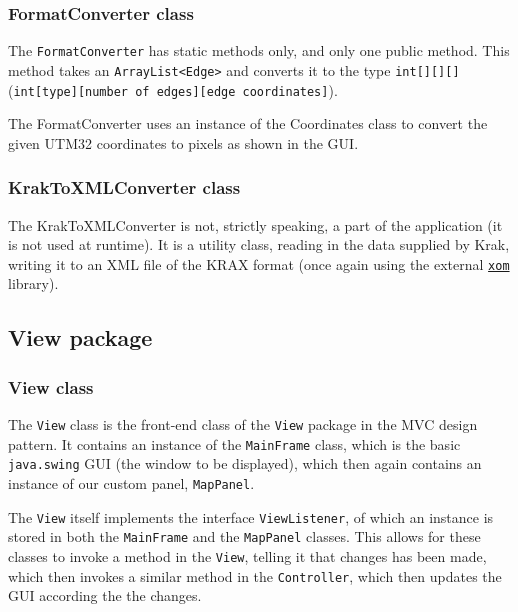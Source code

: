 \documentclass[a4paper,11pt]{article}
\begin{document}
\subsubsection{FormatConverter class} %
The \texttt{FormatConverter} has static methods only, and only one public method. This method takes an \texttt{ArrayList<Edge>} and converts it to the type \texttt{int[][][]} (\texttt{int[type][number of edges][edge coordinates]}).

The FormatConverter uses an instance of the Coordinates class to convert the given UTM32 coordinates to pixels as shown in the GUI.

\subsubsection{KrakToXMLConverter class} %
The KrakToXMLConverter is not, strictly speaking, a part of the application (it is not used at runtime). It is a utility class, reading in the data supplied by Krak, writing it to an XML file of the KRAX format (once again using the external \href{www.xom.nu}{\texttt{xom}} library).

\subsection{View package} %

\subsubsection{View class} %
The \texttt{View} class is the front-end class of the \texttt{View} package in the MVC design pattern. It contains an instance of the \texttt{MainFrame} class, which is the basic \texttt{java.swing} GUI (the window to be displayed), which then again contains an instance of our custom panel, \texttt{MapPanel}.

The \texttt{View} itself implements the interface \texttt{ViewListener}, of which an instance is stored in both the \texttt{MainFrame} and the \texttt{MapPanel} classes. This allows for these classes to invoke a method in the \texttt{View}, telling it that changes has been made, which then invokes a similar method in the \texttt{Controller}, which then updates the GUI according the the changes.
\end{document}
